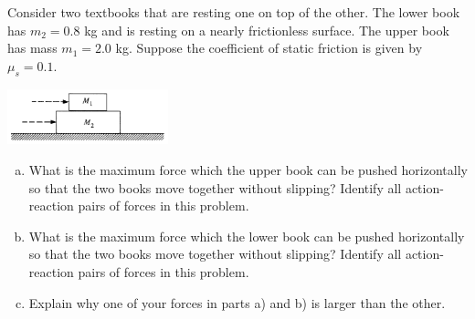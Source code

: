 \documentclass{esg8012pset}
\begin{document}
\begin{problem}[Problem 2.7]
  Consider two textbooks that are resting one on top of the other. The lower book has $m_2 = 0.8$ kg and is resting on a nearly frictionless surface. The upper book has mass $m_1 = 2.0$ kg. Suppose the coefficient of static friction is given by $\mu_s = 0.1$.
  \begin{center}\includegraphics[width=0.35\textwidth]{ps02_2}\end{center}
  \begin{enumerate}[a)]
    \item What is the maximum force which the upper book can be pushed horizontally so that the two books move together without slipping? Identify all action-reaction pairs of forces in this problem.
    \item What is the maximum force which the lower book can be pushed horizontally so that the two books move together without slipping? Identify all action-reaction pairs of forces in this problem.
    \item Explain why one of your forces in parts a) and b) is larger than the other.
  \end{enumerate}
\end{problem}
\end{document}
